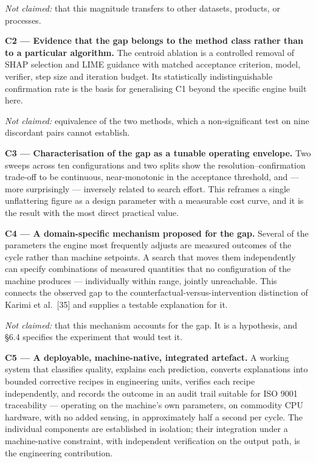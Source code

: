 \emph{Not claimed:} that this magnitude transfers to other datasets, products, or processes.

\textbf{C2 --- Evidence that the gap belongs to the method class rather than to a particular algorithm.} The centroid ablation is a controlled removal of SHAP selection and LIME guidance with matched acceptance criterion, model, verifier, step size and iteration budget. Its statistically indistinguishable confirmation rate is the basis for generalising C1 beyond the specific engine built here.

\emph{Not claimed:} equivalence of the two methods, which a non-significant test on nine discordant pairs cannot establish.

\textbf{C3 --- Characterisation of the gap as a tunable operating envelope.} Two sweeps across ten configurations and two splits show the resolution--confirmation trade-off to be continuous, near-monotonic in the acceptance threshold, and --- more surprisingly --- inversely related to search effort. This reframes a single unflattering figure as a design parameter with a measurable cost curve, and it is the result with the most direct practical value.

\textbf{C4 --- A domain-specific mechanism proposed for the gap.} Several of the parameters the engine most frequently adjusts are measured outcomes of the cycle rather than machine setpoints. A search that moves them independently can specify combinations of measured quantities that no configuration of the machine produces --- individually within range, jointly unreachable. This connects the observed gap to the counterfactual-versus-intervention distinction of Karimi et al.~{[}35{]} and supplies a testable explanation for it.

\emph{Not claimed:} that this mechanism accounts for the gap. It is a hypothesis, and §6.4 specifies the experiment that would test it.

\textbf{C5 --- A deployable, machine-native, integrated artefact.} A working system that classifies quality, explains each prediction, converts explanations into bounded corrective recipes in engineering units, verifies each recipe independently, and records the outcome in an audit trail suitable for ISO 9001 traceability --- operating on the machine's own parameters, on commodity CPU hardware, with no added sensing, in approximately half a second per cycle. The individual components are established in isolation; their integration under a machine-native constraint, with independent verification on the output path, is the engineering contribution.


